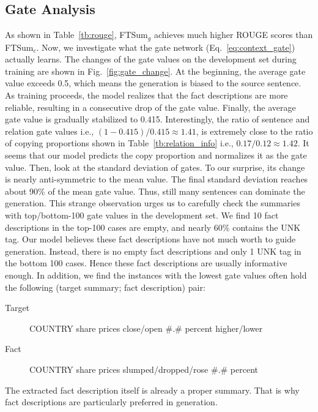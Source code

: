 \documentclass[letterpaper]{article} %
\begin{document}
	\subsection{Gate Analysis}
	As shown in Table~\ref{tb:rouge}, FTSum$_g$ achieves much higher ROUGE scores than FTSum$_c$.
	Now, we investigate what the gate network (Eq.~\ref{eq:context_gate}) actually learns.
	The changes of the gate values on the development set during training are shown in Fig.~\ref{fig:gate_change}.
	At the beginning, the average gate value exceeds 0.5, which means the generation is biased to the source sentence.
	As training proceeds, the model realizes that the fact descriptions are more reliable, resulting in a consecutive drop of the gate value.
	Finally, the average gate value is gradually stabilized to 0.415.
	Interestingly, the ratio of sentence and relation gate values i.e.,
	$(1 - 0.415)/0.415 \approx 1.41$, is extremely close to the ratio of copying proportions shown in Table~\ref{tb:relation_info} i.e.,
	$0.17/0.12 \approx 1.42$.
	It seems that our model predicts the copy proportion and normalizes it as the gate value.
	Then, look at the standard deviation of gates.
	To our surprise, its change is nearly anti-symmetric to the mean value.
	The final standard deviation reaches about 90\% of the mean gate value.
	Thus, still many sentences can dominate the generation.
	This strange observation urges us to carefully check the summaries with top/bottom-100 gate values in the development set.
	We find 10 fact descriptions in the top-100 cases are empty, and nearly 60\% contains the UNK tag.
	Our model believes these fact descriptions have not much worth to guide generation.
	Instead, there is no empty fact descriptions and only 1 UNK tag in the bottom 100 cases.
	Hence these fact descriptions are usually informative enough.
	In addition, we find the instances with the lowest gate values often hold the following (target summary; fact description) pair: 
	\begin{description}
		\item[Target] COUNTRY share prices close/open \#.\# percent higher/lower
		\item[Fact] COUNTRY share prices slumped/dropped/rose \#.\# percent
	\end{description}
	The extracted fact description itself is already a proper summary.
	That is why fact descriptions are particularly preferred in generation.
	
\end{document}
